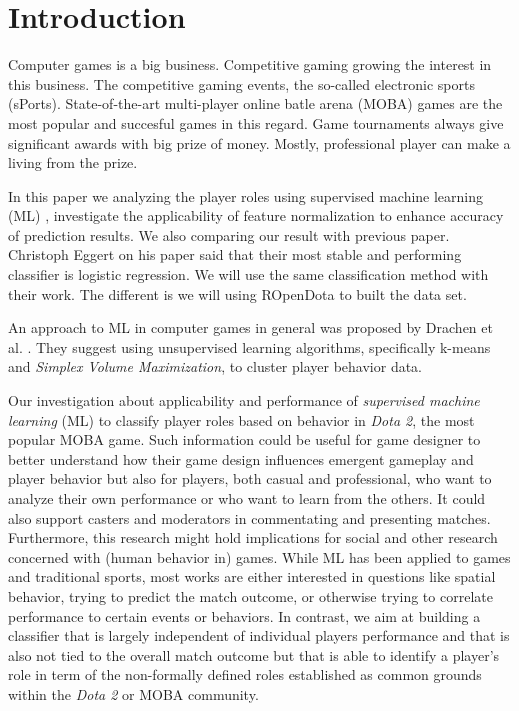 \section{Introduction}

Computer games is a big business. Competitive gaming growing the interest in this business. The competitive gaming events, the so-called electronic sports (sPorts). State-of-the-art multi-player online batle arena (MOBA) games are the most popular and succesful games in this regard. Game tournaments always give significant awards with big prize of money. Mostly, professional player can make a living from the prize. 

In this paper we analyzing the player roles using supervised machine learning (ML) , investigate the applicability of feature normalization to enhance accuracy of prediction results. We also comparing our result with previous paper. Christoph Eggert on his paper said that their most stable and performing classifier is logistic regression. We will use the same classification method with their work. The different is we will using ROpenDota to built the data set.

An approach to ML in computer games in general was proposed by Drachen et al.\cite{drachen2014skill} . They suggest using unsupervised learning algorithms, specifically k-means and \textit{Simplex Volume Maximization}, to cluster player behavior data.

Our investigation about applicability and performance of \textit{supervised machine learning} (ML) to classify player roles based on behavior in \textit{Dota 2}, the most popular MOBA game. Such information could be useful for game designer to better understand how their game design influences emergent gameplay and player behavior but also for players, both casual and professional, who want to analyze their own performance or who want to learn from the others. It could also support casters and moderators in commentating and presenting matches. Furthermore, this research might hold implications for social and other research concerned with (human behavior in) games. While ML has been applied to games and traditional sports, most works are either interested in questions like spatial behavior, trying to predict the match outcome, or otherwise trying to correlate performance to certain events or behaviors. In contrast, we aim at building a classifier that is largely independent of individual players performance and that is also not tied to the overall match outcome but that is able to identify a player's role in term of the non-formally defined roles established as common grounds within the \textit{Dota 2} or MOBA community.

